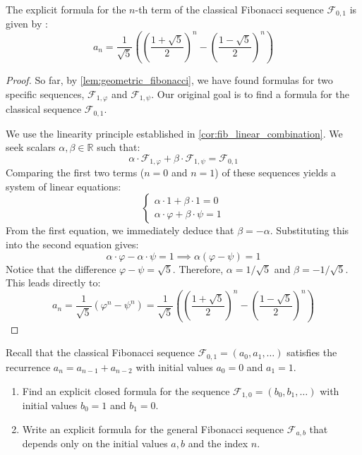 \begin{theorem}
\label{thm:binet_formula}
The explicit formula for the $n$-th term of the classical Fibonacci sequence $\mathcal{F}_{0,1}$ is given by :
\[
a_n = \frac{1}{\sqrt{5}} \left( \left(\frac{1+\sqrt{5}}{2}\right)^n - \left(\frac{1-\sqrt{5}}{2}\right)^n \right)
\]
\end{theorem}

\begin{proof}
So far, by \cref{lem:geometric_fibonacci}, we have found formulas for two specific sequences, $\mathcal{F}_{1, \varphi}$ and $\mathcal{F}_{1, \psi}$. Our original goal is to find a formula for the classical sequence $\mathcal{F}_{0,1}$.

We use the linearity principle established in \cref{cor:fib_linear_combination}. We seek scalars $\alpha, \beta \in \mathbb{R}$ such that:
\[
\alpha \cdot \mathcal{F}_{1, \varphi} + \beta \cdot \mathcal{F}_{1, \psi} = \mathcal{F}_{0,1}
\]
Comparing the first two terms ($n=0$ and $n=1$) of these sequences yields a system of linear equations:
\begin{equation}
\begin{cases}
\alpha \cdot 1 + \beta \cdot 1 = 0 \\
\alpha \cdot \varphi + \beta \cdot \psi = 1
\end{cases}
\end{equation}
From the first equation, we immediately deduce that $\beta = -\alpha$. Substituting this into the second equation gives:
\[
\alpha \cdot \varphi - \alpha \cdot \psi = 1 \implies \alpha (\varphi - \psi) = 1
\]
Notice that the difference $\varphi - \psi = \sqrt{5}$. Therefore, $\alpha = 1/\sqrt{5}$ and $\beta = -1/\sqrt{5}$. This leads directly to:
\[
a_n = \frac{1}{\sqrt{5}} (\varphi^n - \psi^n) = \frac{1}{\sqrt{5}} \left( \left(\frac{1+\sqrt{5}}{2}\right)^n - \left(\frac{1-\sqrt{5}}{2}\right)^n \right)
\]
\end{proof}

\begin{exercise}
\label{exc:golden_ratio_part1}
Recall that the classical Fibonacci sequence $\mathcal{F}_{0,1} = (a_0, a_1, \dots)$ satisfies the recurrence $a_n = a_{n-1} + a_{n-2}$ with initial values $a_0 = 0$ and $a_1 = 1$.
\begin{enumerate}
    \item Find an explicit closed formula for the sequence $\mathcal{F}_{1,0} = (b_0, b_1, \dots)$ with initial values $b_0 = 1$ and $b_1 = 0$.
    \item Write an explicit formula for the general Fibonacci sequence $\mathcal{F}_{a,b}$ that depends only on the initial values $a, b$ and the index $n$.
\end{enumerate}
\end{exercise}

